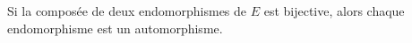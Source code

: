 Si la composée de deux endomorphismes de $E$ est bijective, alors chaque endomorphisme est un automorphisme.

\begin{reponses}
\end{reponses}

\begin{comment}
En dimension finie c'est vrai.
\end{comment}

